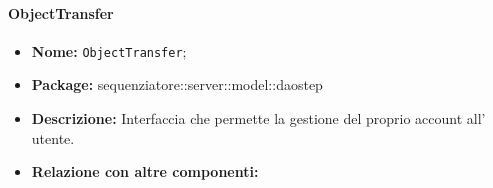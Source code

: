 \paragraph{ObjectTransfer}
	\begin{itemize}
		\item \textbf{Nome:} \texttt{ObjectTransfer};
		\item \textbf{Package:} sequenziatore::server::model::daostep
		\item \textbf{Descrizione:} Interfaccia che permette la gestione del proprio account all' utente.
		\item \textbf{Relazione con altre componenti:}
	\end{itemize}